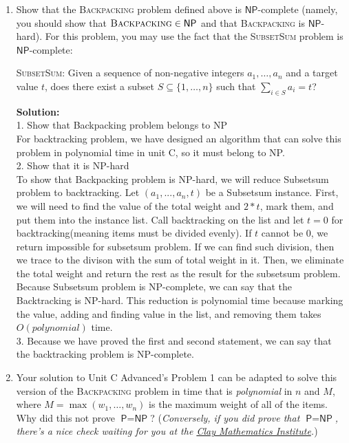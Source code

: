 \documentclass[10pt]{article}
\newcommand{\solution}[1]{\color{blue}\hfill\break\noindent\textbf{Solution:} #1\color{black}}
\begin{document}
\begin{enumerate}
  \item Show that the \textsc{Backpacking} problem defined above is $\mathsf{NP}$-complete (namely, you should
  show that $\textsc{Backpacking} \in \mathsf{NP}$ and that \textsc{Backpacking} is $\mathsf{NP}$-hard). For this
  problem, you may use the fact that the \textsc{SubsetSum} problem is $\mathsf{NP}$-complete:

  \begin{minipage}[t]{\linewidth}
  \begin{framed}
    \textsc{SubsetSum}: Given a sequence of non-negative integers $a_1, \ldots, a_n$
    and a target value $t$, does there exist
    a subset $S \subseteq \{ 1, \ldots, n \}$ such that $\sum_{i \in S} a_i = t$?
  \end{framed}
  \end{minipage}
  
  \solution{\\
  1. Show that Backpacking problem belongs to NP\\
  For backtracking problem, we have designed an algorithm that can solve this problem in polynomial time in unit C, so it must belong to NP.\\
  2. Show that it is NP-hard\\
  To show that Backpacking problem is NP-hard, we will reduce Subsetsum problem to backtracking. Let $(a_1,...,a_n,t)$ be a Subsetsum instance. First, we will need to find the value of the total weight and $2*t$, mark them, and put them into the instance list. Call backtracking on the list and let $t=0$ for backtracking(meaning items must be divided evenly). If $t$ cannot be $0$, we return impossible for subsetsum problem. If we can find such division, then we trace to the divison with the sum of total weight in it. Then, we eliminate the total weight and return the rest as the result for the subsetsum problem. Because Subsetsum problem is NP-complete, we can say that the Backtracking is NP-hard. This reduction is polynomial time because marking the value, adding and finding value in the list, and removing them takes $O(polynomial)$ time.\\
  3. Because we have proved the first and second statement, we can say that the backtracking problem is NP-complete.
  }

  \item Your solution to Unit C Advanced's Problem 1 can be adapted to solve this version of the \textsc{Backpacking} problem
  in time that is {\em polynomial} in $n$ and $M$, where $M = \max(w_1, \ldots, w_n)$ is the maximum weight of all of the items. Why did this
  not prove $\textsf{P} = \textsf{NP}$? ({\em Conversely, if you did prove that $\textsf{P} = \textsf{NP}$, there's a nice
  check waiting for you at the \href{https://www.claymath.org/millennium-problems/p-vs-np-problem}{Clay Mathematics Institute}.})
  

\end{enumerate}
\end{document}
